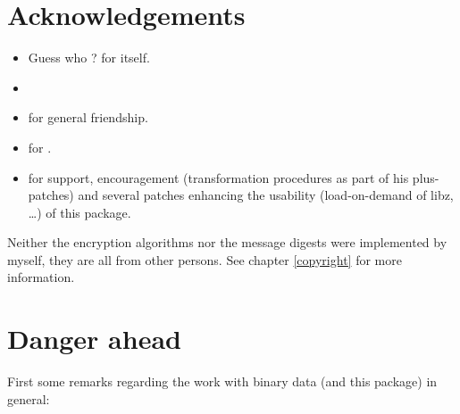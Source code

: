 \documentclass {report}
\begin{document}
\chapter {Acknowledgements}

\begin {itemize}\Large
\item	Guess who ? \jo{} for \tcl {} itself. 
\item	\jyl
\item	\bast{} for general friendship.
\item	\greyham{} for .
\item	\jan{} for support, encouragement
	(transformation procedures as part of his plus-patches) and
	several patches enhancing the usability (load-on-demand of
	libz, \dots{}) of this package.
\end   {itemize}

Neither the encryption algorithms nor the message digests were
implemented by myself, they are all from other persons. See chapter
\ref {copyright} for more information.


\chapter {Danger ahead}

First some remarks regarding the work with binary data (and this
package) in general:
\end{document}
